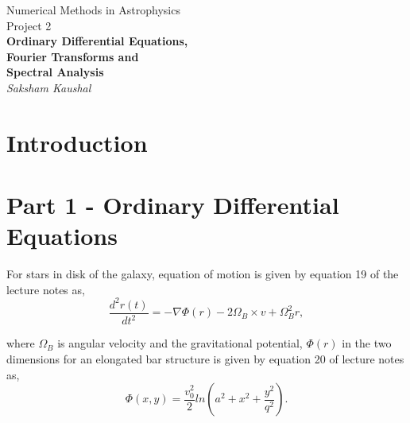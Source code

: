 \documentclass[a4paper]{article}
\begin{document}
	
	
	\begin{titlepage}
		\begin{center}
			\Large Numerical Methods in Astrophysics \\
			\vspace{1cm}
			\huge{
				Project 2 \\
				\vspace{0.5cm}
				\textbf{Ordinary Differential Equations,}\\
				\textbf{Fourier Transforms and} \\
				\textbf{Spectral Analysis} \\
				\vspace{1cm}
			}
			\Large \emph{Saksham Kaushal}
		\end{center}
	\end{titlepage}
	
	
	\tableofcontents
	\newpage
	
	
	\section{Introduction} \label{Introduction}
	
	
	\newpage
	\section{Part 1 - Ordinary Differential Equations} \label{task1}
	
	For stars in disk of the galaxy, equation of motion is given by equation 19 of the lecture notes as,
	\begin{equation}
		\frac{d^2r(t)}{dt^2} = - \nabla \Phi (r) -2 \Omega_B \times v+ \Omega_B^2 r ,
		\label{eq:motion1}
	\end{equation}
	
	where \(\Omega_B\) is angular velocity and the gravitational potential, \(\Phi (r)\) in the two dimensions for an elongated bar structure is given by equation 20 of lecture notes as,
	\begin{equation}
		\Phi(x,y)=\frac{v_0^2}{2} ln(a^2+x^2+\frac{y^2}{q^2}). 
		\label{eq:grav_potential}
	\end{equation}
	
\end{document}
